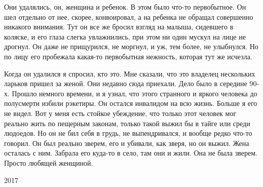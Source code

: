 Они удалялись, он, женщина и ребенок. В этом было что-то первобытное. Он шел
отдельно от нее, скорее, конвоировал, а на ребенка не обращал совершенно
никакого внимания. Тут он все же бросил взгляд на малыша, сидевшего в коляске,
и его глаза слегка увлажнились, при этом ни один мускул на лице не дрогнул. Он
даже не прищурился, не моргнул, и уж, тем более, не улыбнулся. Но по лицу его
пробежала какая-то первобытная нежность, которая тут же исчезла.

Когда он удалился я спросил, кто это. Мне сказали, что это владелец нескольких
ларьков пришел за женой. Они недавно сюда приехали. Дело было в середине 90-х.
Прошло немного времени, и я узнал, что этого странного и яркого человека до
полусмерти избили рэкетиры. Он остался инвалидом на всю жизнь. Больше я его не
видел. Вот у меня есть стойкое убеждение, что только этот человек мог реально
жить по пещерным законам, только такой выжил бы в тайге или среди людоедов. Но
он не бил себя в грудь, не выпендривался, и вообще редко что-то говорил. Он был
реально зверем, его и убивали, как зверя, но он выжил. Жена осталась с ним.
Забрала его куда-то в село, там они и жили. Она не была зверем. Просто любящей
женщиной.

2017

